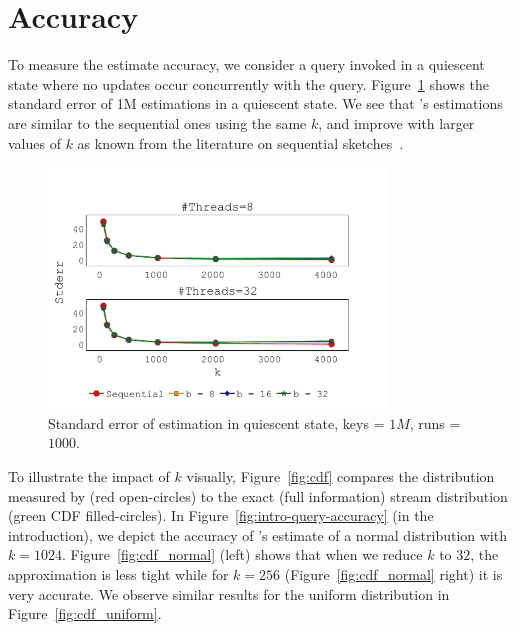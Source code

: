 \section{Accuracy}
\label{sec:accuracy} 
To measure the estimate accuracy, we consider a query invoked in a quiescent state where no updates occur concurrently with the query. Figure~\ref{fig: accuracy_stderr} shows the standard error of 1M estimations in a quiescent state.%
We see that \mysketch's estimations are similar to the sequential ones using the same $k$, and improve with larger values of $k$ as known from the literature on sequential sketches~\cite{mergeables_summaries}.
\begin{figure}[h!]
    \centering
    \includegraphics[width=0.8\textwidth,trim={0 0cm 0cm 1.7cm},clip]
    {graphics/graphs/accuracy/oracle_Quancurrent_block_numa_query_hist_stderr_qs_keys983040_runs1000_k_64_128_256_512_1024_2048_4096_b_8_16_32_T_8_32_11-08-2022_20-26-21.pdf}
    \caption{Standard error of estimation in quiescent state, keys = $1M$, runs = $1000$.}
    \label{fig: accuracy_stderr}
\end{figure}

To illustrate the impact of $k$ visually, Figure~\ref{fig:cdf} compares the distribution measured by \mysketch (red open-circles) to the exact (full information) stream distribution (green CDF filled-circles). In Figure~\ref{fig:intro-query-accuracy} (in the introduction), we depict the accuracy of \mysketch's estimate of a normal distribution with $k=1024$. Figure~\ref{fig:cdf_normal} (left) shows that when we reduce $k$ to $32$, the approximation is less tight while for $k=256$ (Figure~\ref{fig:cdf_normal} right) it is very accurate. We observe similar results for the uniform distribution in Figure~\ref{fig:cdf_uniform}. 

